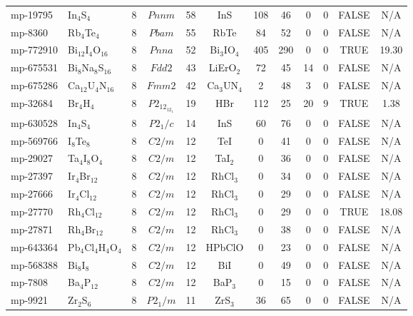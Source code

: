 {\begin{longtable}{llcccccccccc}
    mp-19795 & In$_{4}$S$_{4}$ & 8     & $Pnnm$ & 58    & InS   & 108   & 46    & 0     & 0     & FALSE & N/A \\
    mp-8360 & Rb$_{4}$Te$_{4}$ & 8     & $Pbam$ & 55    & RbTe  & 84    & 52    & 0     & 0     & FALSE & N/A \\
    mp-772910 & Bi$_{12}$I$_{4}$O$_{16}$ & 8     & $Pnna$ & 52    & Bi$_{3}$IO$_{4}$ & 405   & 290   & 0     & 0     & TRUE  & 19.30  \\
    mp-675531 & Bi$_{8}$Na$_{8}$S$_{16}$ & 8     & $Fdd2$ & 43    & LiErO$_{2}$ & 72    & 45    & 14    & 0     & FALSE & N/A \\
    mp-675286 & Ca$_{12}$U$_{4}$N$_{16}$ & 8     & $Fmm2$ & 42    & Ca$_{3}$UN$_{4}$ & 2     & 48    & 3     & 0     & FALSE & N/A \\
    mp-32684 & Br$_{4}$H$_{4}$ & 8     & $P2_12_12_1$ & 19    & HBr   & 112   & 25    & 20    & 9     & TRUE  & 1.38  \\
    mp-630528 & In$_{4}$S$_{4}$ & 8     & $P2_1/c$ & 14    & InS   & 60    & 76    & 0     & 0     & FALSE & N/A \\
    mp-569766 & I$_{8}$Te$_{8}$ & 8     & $C2/m$ & 12    & TeI   & 0     & 41    & 0     & 0     & FALSE & N/A \\
    mp-29027 & Ta$_{4}$I$_{8}$O$_{4}$ & 8     & $C2/m$ & 12    & TaI$_{2}$ & 0     & 36    & 0     & 0     & FALSE & N/A \\
    mp-27397 & Ir$_{4}$Br$_{12}$ & 8     & $C2/m$ & 12    & RhCl$_{3}$ & 0     & 34    & 0     & 0     & FALSE & N/A \\
    mp-27666 & Ir$_{4}$Cl$_{12}$ & 8     & $C2/m$ & 12    & RhCl$_{3}$ & 0     & 29    & 0     & 0     & FALSE & N/A \\
    mp-27770 & Rh$_{4}$Cl$_{12}$ & 8     & $C2/m$ & 12    & RhCl$_{3}$ & 0     & 29    & 0     & 0     & TRUE  & 18.08  \\
    mp-27871 & Rh$_{4}$Br$_{12}$ & 8     & $C2/m$ & 12    & RhCl$_{3}$ & 0     & 38    & 0     & 0     & FALSE & N/A \\
    mp-643364 & Pb$_{4}$Cl$_{4}$H$_{4}$O$_{4}$ & 8     & $C2/m$ & 12    & HPbClO & 0     & 23    & 0     & 0     & FALSE & N/A \\
    mp-568388 & Bi$_{8}$I$_{8}$ & 8     & $C2/m$ & 12    & BiI   & 0     & 49    & 0     & 0     & FALSE & N/A \\
    mp-7808 & Ba$_{4}$P$_{12}$ & 8     & $C2/m$ & 12    & BaP$_{3}$ & 0     & 15    & 0     & 0     & FALSE & N/A \\
    mp-9921 & Zr$_{2}$S$_{6}$ & 8     & $P2_1/m$ & 11    & ZrS$_{3}$ & 36    & 65    & 0     & 0     & FALSE & N/A \\

\end{longtable}}
